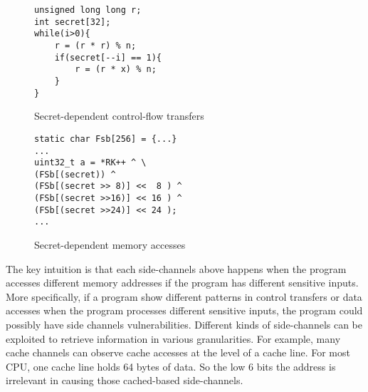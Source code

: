 \begin{figure}[]

\noindent\begin{minipage}{0.45\linewidth}
    \noindent
\begin{lstlisting}[numbers = none]
unsigned long long r;
int secret[32];
while(i>0){
    r = (r * r) % n;
    if(secret[--i] == 1){
        r = (r * x) % n;
    }
}
\end{lstlisting}
\caption{Secret-dependent control-flow transfers}
\end{minipage}
\hfill
\begin{minipage}{0.45\linewidth}
\begin{lstlisting}[numbers = none]
static char Fsb[256] = {...}
... 
uint32_t a = *RK++ ^ \ 
(FSb[(secret)) ^
(FSb[(secret >> 8)] <<  8 ) ^
(FSb[(secret >>16)] << 16 ) ^
(FSb[(secret >>24)] << 24 );
...
\end{lstlisting}
\caption{Secret-dependent memory accesses}
\end{minipage}
\end{figure}

The key intuition is that each side-channels above happens when the program accesses different 
memory addresses if the program has different sensitive inputs. More specifically, if 
a program show different patterns in control transfers or data accesses when the program 
processes different sensitive inputs, the program could possibly have side channels vulnerabilities. 
Different kinds of side-channels can be exploited to retrieve information
in various granularities. For example, many cache channels can observe cache accesses
at the level of a cache line. For most CPU, one cache line holds 64 bytes of data. So
the low 6 bits the address is irrelevant in causing those cached-based side-channels. 

%


